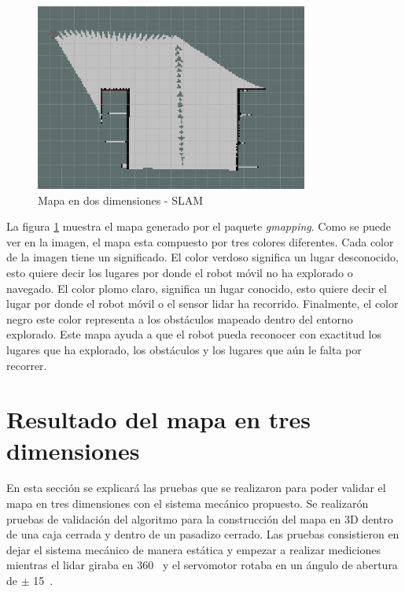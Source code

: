 \begin{figure}
  \centering \footnotesize
  \includegraphics[width=0.80\textwidth]{images/map_slam.png}
  \captionsetup{font=footnotesize}
  \caption{Mapa en dos dimensiones - SLAM}
  \label{fig:SLAM_2D}
\end{figure}

La figura \ref{fig:SLAM_2D} muestra el mapa generado por el paquete \textit{gmapping}. Como 
se puede ver en la imagen, el mapa esta compuesto por tres colores diferentes. Cada color 
de la imagen tiene un significado. El color verdoso significa un lugar desconocido, esto 
quiere decir los lugares por donde el robot móvil no ha explorado o navegado. El color 
plomo claro, significa un lugar conocido, esto quiere decir el lugar por donde el robot 
móvil o el sensor lidar ha recorrido. Finalmente, el color negro este color representa a 
los obstáculos mapeado dentro del entorno explorado. Este mapa ayuda a que el robot pueda 
reconocer con exactitud los lugares que ha explorado, los obstáculos y los lugares que aún 
le falta por recorrer.

\section{Resultado del mapa en tres dimensiones}
En esta sección se explicará las pruebas que se realizaron para poder validar el mapa en 
tres dimensiones con el sistema mecánico propuesto. Se realizarón pruebas de validación 
del algoritmo para la construcción del mapa en 3D dentro de una caja cerrada y dentro de 
un pasadizo cerrado. Las pruebas consistieron en dejar el sistema mecánico de manera 
estática y empezar a realizar mediciones mientras el lidar giraba en 360\grad~ y el 
servomotor rotaba en un ángulo de abertura de $\pm$ 15\grad~.

